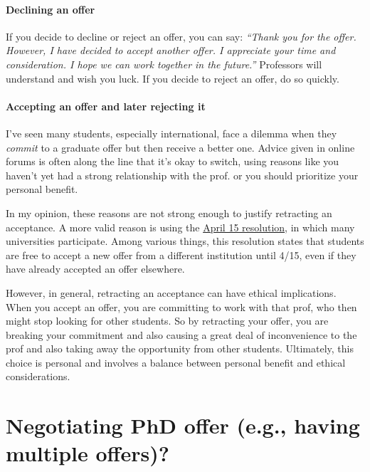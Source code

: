 \documentclass[oneside,11pt,dvipsnames]{book}
\def\sectioninfo#1{%
  \addcontentsline{toc}{sectioninfo}{%
    \noexpand\numberline{}\color{black}{#1}}%
}
\begin{document}
\paragraph{Declining an offer} If you decide to decline or reject an offer, you can say: \emph{``Thank you for the offer. However, I have decided to accept another offer.  I appreciate your time and consideration.  I hope we can work together in the future.''}  Professors will understand and wish you luck.  If you decide to reject an offer, do so quickly.


\paragraph{Accepting an offer and later rejecting it}

I've seen many students, especially international, face a dilemma when they \emph{commit} to a graduate offer but then receive a better one. Advice given in online forums is often along the line that it's okay to switch, using reasons like you haven't yet had a strong relationship with the prof. or you should prioritize your personal benefit.

In my opinion, these reasons are not strong enough to justify retracting an acceptance. A more valid reason is using the \href{https://cgsnet.org/wp-content/uploads/2024/01/CGS_April15_Resolution_Jan312024.pdf}{April 15 resolution}, in which many universities participate. Among various things, this resolution states that students are free to accept a new offer from a different institution until 4/15, even if they have already accepted an offer elsewhere. 

However, in general, retracting an acceptance can have ethical implications. When you accept an offer, you are committing to work with that prof, who then might stop looking for other students. So by retracting your offer, you are breaking your commitment and also causing a great deal of inconvenience to the prof and also taking away the opportunity from other students. 
Ultimately, this choice is personal and involves a balance between personal benefit and ethical considerations.

\section{Negotiating PhD offer (e.g., having multiple offers)?}\label{sec:negotiate}
\sectioninfo{You will not be able to negotiate stipend, but you can ask for specific start date, TA assignment, and conference travel budget.}
\end{document}
